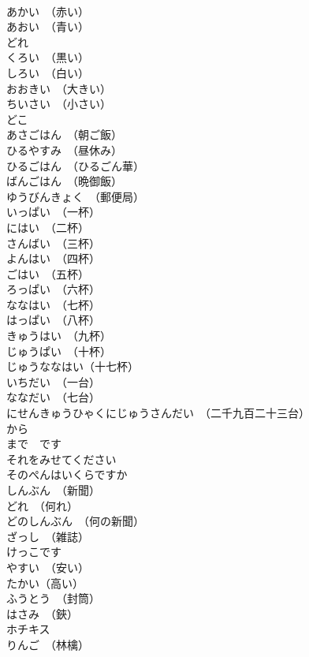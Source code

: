 \documentclass[8pt]{extreport}
\begin{document}
\begin{CJK}{UTF8}{min}
\\	あかい　（赤い）	
\\	あおい　（青い）	
\\	どれ	
\\	くろい　（黒い）	
\\	しろい　（白い）	
\\	おおきい　（大きい）	
\\	ちいさい　（小さい）	
\\	どこ	
\\	あさごはん　（朝ご飯）	
\\	ひるやすみ　（昼休み）	
\\	ひるごはん　（ひるごん華）	
\\	ばんごはん　（晩御飯）	
\\	ゆうびんきょく　（郵便局）	
\\	いっぱい　（一杯）	
\\	にはい　（二杯）	
\\	さんばい　（三杯）	
\\	よんはい　（四杯）	
\\	ごはい　（五杯）	
\\	ろっぱい　（六杯）	
\\	ななはい　（七杯）	
\\	はっぱい　（八杯）	
\\	きゅうはい　（九杯）	
\\	じゅうぱい　（十杯）	
\\	じゅうななはい（十七杯）	
\\	いちだい　（一台）	
\\	ななだい　（七台）	
\\	にせんきゅうひゃくにじゅうさんだい　（二千九百二十三台）	
\\	から　
\\	まで　です	
\\	それをみせてください	
\\	そのぺんはいくらですか	
\\	しんぶん　（新聞）	
\\	どれ　（何れ）	
\\	どのしんぶん　（何の新聞）	
\\	ざっし　（雑誌）	
\\	けっこです	
\\	やすい　（安い）	
\\	たかい（高い）	
\\	ふうとう　（封筒）	
\\	はさみ　（鋏）	
\\	ホチキス	
\\	りんご　（林檎）	

\end{CJK}
\end{document}
